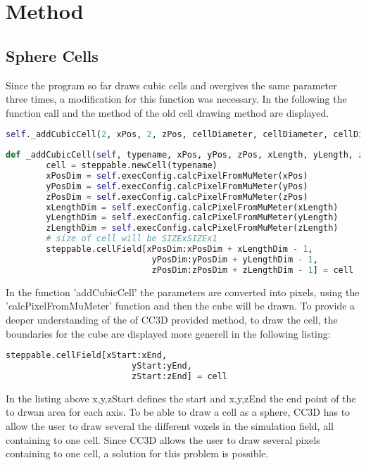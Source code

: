 \chapter{Method}
    

\section{Sphere Cells}
Since the program so far draws cubic cells and overgives the same parameter three times, a modification for this function was necessary. In the following the function call and the method of the old cell drawing method are displayed.
\begin{lstlisting}[language=Python, caption = function call of the cell drawing method addCubicCell for a 3D cell]
self._addCubicCell(2, xPos, 2, zPos, cellDiameter, cellDiameter, cellDiameter, steppable)
\end{lstlisting}
\begin{lstlisting}[language=Python, caption = method to draw cubic cells]
    def _addCubicCell(self, typename, xPos, yPos, zPos, xLength, yLength, zLength, steppable):
        cell = steppable.newCell(typename)
        xPosDim = self.execConfig.calcPixelFromMuMeter(xPos)
        yPosDim = self.execConfig.calcPixelFromMuMeter(yPos)
        zPosDim = self.execConfig.calcPixelFromMuMeter(zPos)
        xLengthDim = self.execConfig.calcPixelFromMuMeter(xLength)
        yLengthDim = self.execConfig.calcPixelFromMuMeter(yLength)
        zLengthDim = self.execConfig.calcPixelFromMuMeter(zLength)
        # size of cell will be SIZExSIZEx1
        steppable.cellField[xPosDim:xPosDim + xLengthDim - 1,
        					 yPosDim:yPosDim + yLengthDim - 1,
        					 zPosDim:zPosDim + zLengthDim - 1] = cell
\end{lstlisting}
In the function 'addCubicCell' the parameters are converted into pixels, using the 'calcPixelFromMuMeter' function and then the cube will be drawn. To provide a deeper understanding of the of \ac{CC3D} provided method, to draw the cell, the boundaries for the cube are displayed more generell in the following listing:
\begin{lstlisting}[language=Python, caption = boundaries of a drawn cuboid]
    steppable.cellField[xStart:xEnd,
    					 yStart:yEnd,
    					 zStart:zEnd] = cell
\end{lstlisting}        		
In the listing above x,y,zStart defines the start and x,y,zEnd the end point of the to drwan area for each axis.\newline
To be able to draw a cell as a sphere, \ac{CC3D} has to allow the user to draw several the different voxels in the simulation field, all containing to one cell. Since \ac{CC3D} allows the user to draw several pixels containing to one cell, a solution for this problem is possible.


